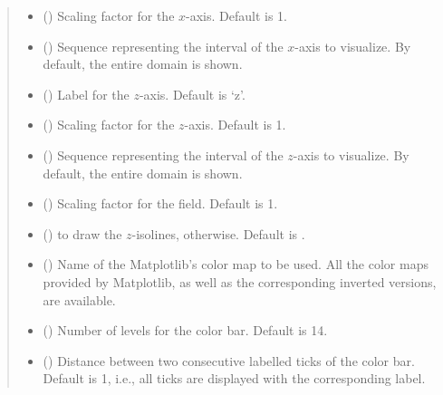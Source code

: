 \documentclass[letterpaper,10pt,english]{sphinxmanual}
\begin{document}
\begin{fulllineitems}
\begin{quote}
\begin{description}
\begin{itemize}
\item {} 
 () \textendash{} Scaling factor for the \(x\)-axis. Default is 1.

\item {} 
 () \textendash{} Sequence representing the interval of the \(x\)-axis to visualize.
By default, the entire domain is shown.

\item {} 
 () \textendash{} Label for the \(z\)-axis. Default is ‘z’.

\item {} 
 () \textendash{} Scaling factor for the \(z\)-axis. Default is 1.

\item {} 
 () \textendash{} Sequence representing the interval of the \(z\)-axis to visualize.
By default, the entire domain is shown.

\item {} 
 () \textendash{} Scaling factor for the field. Default is 1.

\item {} 
 () \textendash{}  to draw the \(z\)-isolines,  otherwise. Default is .

\item {} 
 () \textendash{} Name of the Matplotlib’s color map to be used. All the color maps provided by Matplotlib,
as well as the corresponding inverted versions, are available.

\item {} 
 () \textendash{} Number of levels for the color bar. Default is 14.

\item {} 
 () \textendash{} Distance between two consecutive labelled ticks of the color bar. Default is 1, i.e.,
all ticks are displayed with the corresponding label.


\end{itemize}
\end{description}
\end{quote}
\end{fulllineitems}
\end{document}
